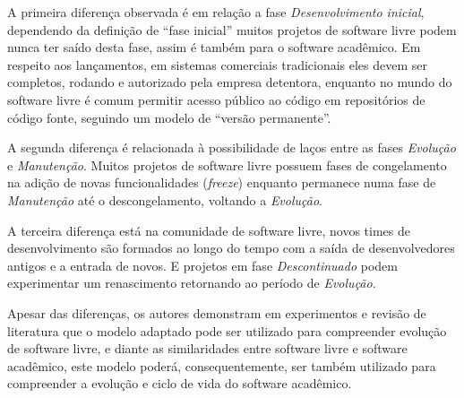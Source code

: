 A primeira diferença observada é em relação a fase {\it Desenvolvimento inicial},
dependendo da definição de ``fase inicial'' muitos projetos de software livre
podem nunca ter saído desta fase, assim é também para o software acadêmico. Em respeito aos lançamentos,
em sistemas comerciais tradicionais eles devem ser completos, rodando e autorizado
pela empresa detentora, enquanto no mundo do software livre é comum
permitir acesso público ao código em repositórios de código fonte, seguindo
um modelo de ``versão permanente''.

A segunda diferença é relacionada à possibilidade de laços entre
as fases {\it Evolução} e {\it Manutenção}. Muitos projetos de software livre
possuem fases de congelamento na adição de novas funcionalidades ({\it freeze})
enquanto permanece numa fase de {\it Manutenção} até o descongelamento, voltando
a {\it Evolução}.

A terceira diferença está na comunidade de software livre,
novos times de desenvolvimento são formados ao longo do tempo
com a saída de desenvolvedores antigos e a entrada de novos.
E projetos em fase {\it Descontinuado} podem experimentar um renascimento
retornando ao período de {\it Evolução}.

Apesar das diferenças, os autores  demonstram em experimentos e
revisão de literatura que o modelo adaptado pode ser utilizado para
compreender evolução de software livre, e diante as similaridades entre software livre
e software acadêmico, este modelo poderá, consequentemente, ser também
utilizado para compreender a evolução e ciclo de vida do software acadêmico.
